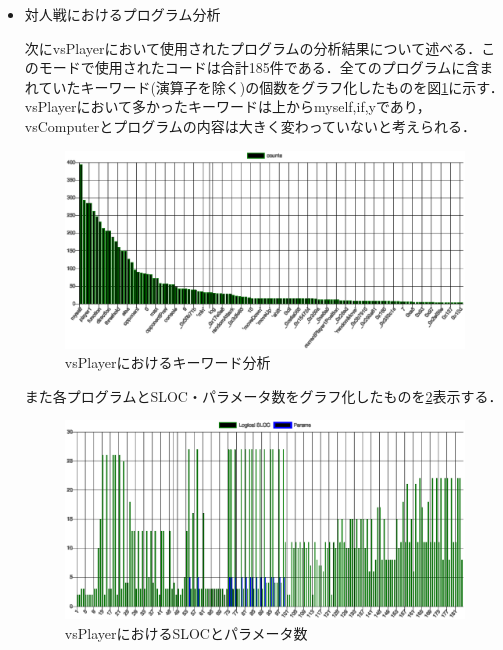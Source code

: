 \begin{itemize}
  \item 対人戦におけるプログラム分析

  次にvsPlayerにおいて使用されたプログラムの分析結果について述べる．このモードで使用されたコードは合計185件である．全てのプログラムに含まれていたキーワード(演算子を除く)の個数をグラフ化したものを図\ref{vsPlayer_keyword}に示す．vsPlayerにおいて多かったキーワードは上からmyself,if,yであり，vsComputerとプログラムの内容は大きく変わっていないと考えられる．

  \begin{figure}[!ht]
    \begin{center}
      \includegraphics[width=1.0\linewidth]{image/vsPlayer_result.eps}
    \end{center}
      \vspace{-8mm} 
    \caption{vsPlayerにおけるキーワード分析}
    \label{vsPlayer_keyword}
  \end{figure}

  また各プログラムとSLOC・パラメータ数をグラフ化したものを\ref{vsPlayer_sloc_and_params}表示する．

  \begin{figure}[!ht]
    \begin{center}
      \includegraphics[width=1.0\linewidth]{image/vsPlayer_escomplex_SLOC_params.eps}
    \end{center}
      \vspace{-8mm} 
    \caption{vsPlayerにおけるSLOCとパラメータ数}
    \label{vsPlayer_sloc_and_params}
  \end{figure}


\end{itemize}
